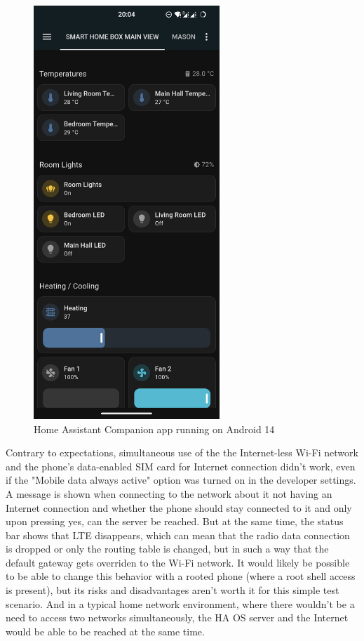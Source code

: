 \begin{figure}[!ht]
  \centering
  \includegraphics[width=70mm, keepaspectratio]{figures/homeassistant_android_screenshot.png}
  \caption{Home Assistant Companion app running on Android 14}
  \label{fig:HAandroidScreenshot}
\end{figure}

Contrary to expectations, simultaneous use of the the Internet-less Wi-Fi network and the phone's data-enabled SIM card for Internet connection didn't work, even if the "Mobile data always active" option was turned on in the developer settings. A message is shown when connecting to the network about it not having an Internet connection and whether the phone should stay connected to it and only upon pressing yes, can the server be reached. But at the same time, the status bar shows that LTE disappears, which can mean that the radio data connection is dropped or only the routing table is changed, but in such a way that the default gateway gets overriden to the Wi-Fi network. It would likely be possible to be able to change this behavior with a rooted phone (where a root shell access is present), but its risks and disadvantages aren't worth it for this simple test scenario. And in a typical home network environment, where there wouldn't be a need to access two networks simultaneously, the HA OS server and the Internet would be able to be reached at the same time.

